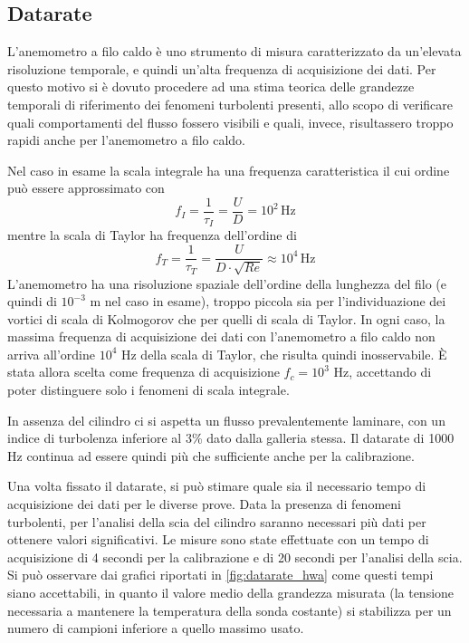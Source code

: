 \documentclass{article} %
\begin{document}
\subsection{Datarate}
L'anemometro a filo caldo è uno strumento di misura caratterizzato da un'elevata risoluzione temporale, e quindi un'alta frequenza di acquisizione dei dati. Per questo motivo si è dovuto procedere ad una stima teorica delle grandezze temporali di riferimento dei fenomeni turbolenti presenti, allo scopo di verificare quali comportamenti del flusso fossero visibili e quali, invece, risultassero troppo rapidi anche per l'anemometro a filo caldo.\par
Nel caso in esame la scala integrale ha una frequenza caratteristica il cui ordine può essere approssimato con
$$f_{I} = \frac{1}{\tau_{I}} = \frac{U}{D} = 10^2\,\textrm{Hz}$$
mentre la scala di Taylor ha frequenza dell'ordine di
$$f_{T} = \frac{1}{\tau_{T}} = \frac{U}{D \cdot \sqrt{Re}} \approx 10^4\,\textrm{Hz}$$
L'anemometro ha una risoluzione spaziale dell'ordine della lunghezza del filo (e quindi di $10^{-3}$ m nel caso in esame), troppo piccola sia per l'individuazione dei vortici di scala di Kolmogorov che per quelli di scala di Taylor. In ogni caso, la massima frequenza di acquisizione dei dati con l'anemometro a filo caldo non arriva all'ordine $10^{4}$ Hz della scala di Taylor, che risulta quindi inosservabile. È stata allora scelta come frequenza di acquisizione $f_c = 10^3$ Hz, accettando di poter distinguere solo i fenomeni di scala integrale. \par%
In assenza del cilindro ci si aspetta un flusso prevalentemente laminare, con un indice di turbolenza inferiore al 3\% dato dalla galleria stessa. Il datarate di 1000 Hz continua ad essere quindi più che sufficiente anche per la calibrazione.\par
Una volta fissato il datarate, si può stimare quale sia il necessario tempo di acquisizione dei dati per le diverse prove. Data la presenza di fenomeni turbolenti, per l'analisi della scia del cilindro saranno necessari più dati per ottenere valori significativi. Le misure sono state effettuate con un tempo di acquisizione di 4 secondi per la calibrazione e di 20 secondi per l'analisi della scia. Si può osservare dai grafici riportati in \cref{fig:datarate_hwa} come questi tempi siano accettabili, in quanto il valore medio della grandezza misurata (la tensione necessaria a mantenere la temperatura della sonda costante) si stabilizza per un numero di campioni inferiore a quello massimo usato.
\end{document}
